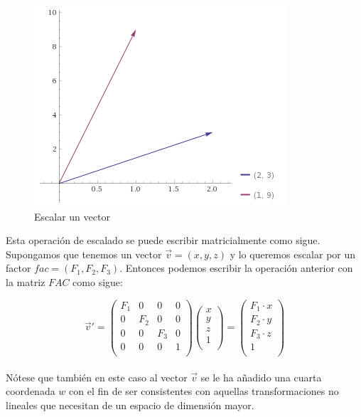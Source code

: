 \begin{figure}[h]
	\centering
	\includegraphics{figures/scaling.png}
	\caption{Escalar un vector}
	\label{fig:scaling}
\end{figure}

Esta operación de escalado se puede escribir matricialmente como sigue.
Supongamos que tenemos un vector $\overrightarrow{v}=(x,y,z)$ y lo queremos
escalar por un factor $fac=(F_1,F_2,F_3)$. Entonces podemos escribir la
operación anterior con la matriz $FAC$ como sigue:

\begin{equation}
	\label{eq:matrixscaling}
	\overrightarrow{v}' = 
	\left( \begin{array}{cccc}
			F_1 & 0   & 0   & 0	\\
			0   & F_2 & 0   & 0	\\
			0   & 0   & F_3 & 0	\\
			0   & 0   & 0   & 1	\\
	\end{array} \right)
	\left( \begin{array}{c}
			x \\
			y \\
			z \\
			1 \\
	\end{array} \right) =
	\left( \begin{array}{c}
			F_1\cdot x \\
			F_2\cdot y \\
			F_3\cdot z \\
			1 \\
	\end{array} \right)
\end{equation}\\

Nótese que también en este caso al vector $\overrightarrow{v}$ se le ha añadido
una cuarta coordenada $w$ con el fin de ser consistentes con aquellas
transformaciones no lineales que necesitan de un espacio de dimensión mayor. 


